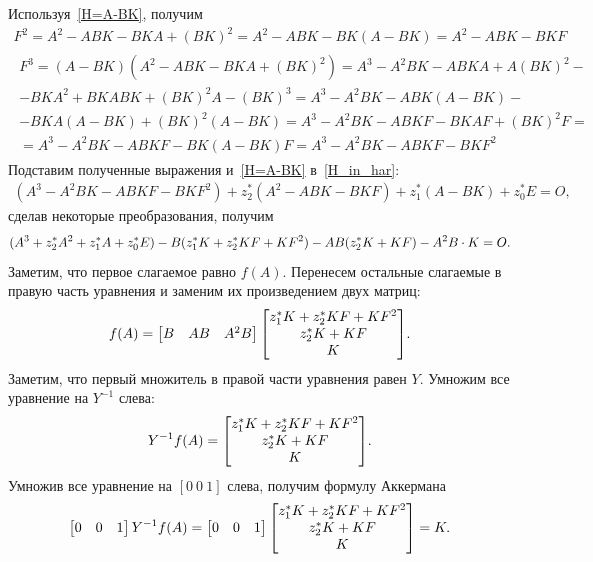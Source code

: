 \documentclass[12pt,a4paper,openany]{extarticle}
\begin{document}
Используя~\eqref{H=A-BK}, получим
\begin{gather}
	F^2 = A^2 - ABK - BKA + (BK)^2 = A^2 - ABK - BK(A-BK) = A^2-ABK-BKF\\
\begin{split}
F^3 = (A-BK)\left(A^2 - ABK - BKA + (BK)^2\right)=A^3-A^2BK-ABKA+A(BK)^2-\\-BKA^2+BKABK+(BK)^2A-(BK)^3=%
A^3-A^2BK-ABK(A-BK)-\\-BKA(A-BK)+(BK)^2(A-BK)=A^3-A^2BK-ABKF-BKAF+(BK)^2F=\\=%
A^3-A^2BK-ABKF-BK(A-BK)F=A^3-A^2BK-ABKF-BKF^2
\end{split}
\end{gather}
Подставим полученные выражения и~\eqref{H=A-BK} в~\eqref{H_in_har}:
\begin{gather}
	(A^3 - A^2BK - ABKF - BKF^2) + z^*_2(A^2-ABK-BKF) + z^*_1(A-BK) + z^*_0E = O,
\end{gather}
сделав некоторые преобразования, получим
\begin{equation}
	(A^3 + z^*_2A^2 + z^*_1A + z^*_0E) - B(z_1^*K + z_2^*KF + KF^2) - AB(z_2^*K + KF) - A^2B\cdot K = O\ldotp
\end{equation}
Заметим, что первое слагаемое равно $f(A)$.
Перенесем остальные слагаемые в правую часть уравнения и заменим их произведением двух матриц:
\begin{equation}
	f(A) =  
	\begin{bmatrix}
		B & AB & A^2B
	\end{bmatrix} 
	\begin{bmatrix}
		z_1^*K + z_2^*KF + KF^2\\
		z_2^*K + KF\\
		K	
	\end{bmatrix}\!\ldotp
\end{equation}
Заметим, что первый множитель в правой части уравнения равен $Y$.
Умножим все уравнение на $Y^{-1}$ слева:
\begin{equation}
	Y^{-1}f(A) =  
	\begin{bmatrix}
		z_1^*K + z_2^*KF + KF^2\\
		z_2^*K + KF\\
		K	
	\end{bmatrix}\!\ldotp
\end{equation}
Умножив все уравнение на $[0\ 0\ 1]$ слева, получим формулу Аккермана
\begin{equation}
	\begin{bmatrix}
		0 & 0 & 1
	\end{bmatrix}
	Y^{-1}f(A) =  
	\begin{bmatrix}
		0 & 0 & 1
	\end{bmatrix}	
	\begin{bmatrix}
		z_1^*K + z_2^*KF + KF^2\\
		z_2^*K + KF\\
		K	
	\end{bmatrix}=K\ldotp
\end{equation}
\end{document}
